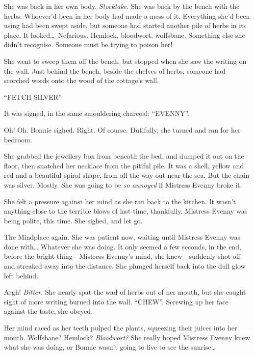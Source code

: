 
She was back in her own body.
\emph{Stocktake}.
She was back by the bench with the herbs.
Whoever'd been in her body had made a mess of it.
Everything she'd been using had been swept aside, but someone had started another pile of herbs in its place.
It looked{\dots}\ Nefarious.
Hemlock, bloodwort, wolfsbane.
Something else she didn't recognise.
Someone must be trying to poison her!

She went to sweep them off the bench, but stopped when she saw the writing on the wall.
Just behind the bench, beside the shelves of herbs, someone had scorched words onto the wood of the cottage's wall.

``FETCH SILVER''

It was signed, in the same smouldering charcoal: ``EVENNY''.

Oh!
Oh.
Bonnie sighed.
Right.
Of course.
Dutifully, she turned and ran for her bedroom.

She grabbed the jewellery box from beneath the bed, and dumped it out on the floor, then snatched her necklace from the pitiful pile.
It was a shell, yellow and red and a beautiful spiral shape, from all the way out near the sea.
But the chain was silver.
Mostly.
She was going to be \emph{so annoyed} if Mistress Evenny broke it.

She felt a pressure against her mind as she ran back to the kitchen.
It wasn't anything close to the terrible blows of last time, thankfully.
Mistress Evenny was being polite, this time.
She sighed, and let go.


The Mindplace again.
She was patient now, waiting until Mistress Evenny was done with{\dots} Whatever she was doing.
It only seemed a few seconds, in the end, before the bright thing---Mistress Evenny's mind, she knew---suddenly shot off and streaked away into the distance.
She plunged herself back into the dull glow left behind.


Argh!
\emph{Bitter}.
She nearly spat the wad of herbs out of her mouth, but she caught sight of more writing burned into the wall.
``CHEW''.
Screwing up her face against the taste, she obeyed.

Her mind raced as her teeth pulped the plants, squeezing their juices into her mouth.
Wolfsbane?
Hemlock?
\emph{Bloodwort?}
She really hoped Mistress Evenny knew what she was doing, or Bonnie wasn't going to live to see the sunrise{\dots}


